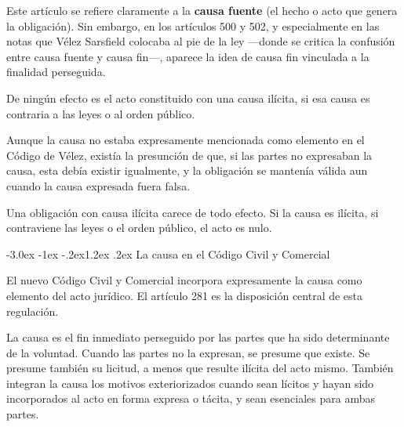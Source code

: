 \documentclass[12pt,oneside]{book}
\makeatletter
\renewcommand\section{\@startsection{section}{1}{\z@}%
  {-3.0ex \@plus -1ex \@minus -.2ex}{1.2ex \@plus .2ex}%
  {\normalfont\large\bfseries\color{acento}}}
\makeatother
\begin{document}
Este artículo se refiere claramente a la \textbf{causa fuente} (el hecho o acto que genera la obligación). Sin embargo, en los artículos 500 y 502, y especialmente en las notas que Vélez Sarsfield colocaba al pie de la ley ---donde se critica la confusión entre causa fuente y causa fin---, aparece la idea de causa fin vinculada a la finalidad perseguida.

\begin{definicion}
De ningún efecto es el acto constituido con una causa ilícita, si esa causa es contraria a las leyes o al orden público.
\end{definicion}

Aunque la causa no estaba expresamente mencionada como elemento en el Código de Vélez, existía la presunción de que, si las partes no expresaban la causa, esta debía existir igualmente, y la obligación se mantenía válida aun cuando la causa expresada fuera falsa.

\begin{importante}
Una obligación con causa ilícita carece de todo efecto. Si la causa es ilícita, si contraviene las leyes o el orden público, el acto es nulo.
\end{importante}


\section{La causa en el Código Civil y Comercial}

El nuevo Código Civil y Comercial incorpora expresamente la causa como elemento del acto jurídico. El artículo 281 es la disposición central de esta regulación.

\begin{definicion}
La causa es el fin inmediato perseguido por las partes que ha sido determinante de la voluntad. Cuando las partes no la expresan, se presume que existe. Se presume también su licitud, a menos que resulte ilícita del acto mismo. También integran la causa los motivos exteriorizados cuando sean lícitos y hayan sido incorporados al acto en forma expresa o tácita, y sean esenciales para ambas partes.
\end{definicion}
\end{document}
